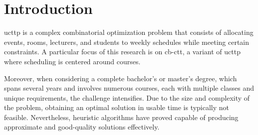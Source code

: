 
\chapter{Introduction}


\label{Introduction}


\ac{ucttp} is a complex combinatorial optimization problem that consists of allocating events, rooms, lecturers, and students to weekly schedules while meeting certain constraints. A particular focus of this research is on \ac{cb-ctt}, a variant of \ac{ucttp} where scheduling is centered around courses. 


Moreover, when considering a complete bachelor’s or master’s degree, which spans several years and involves numerous courses, each with multiple classes and unique requirements, the challenge intensifies. Due to the size and complexity of the problem, obtaining an optimal solution in usable time is typically not feasible. Nevertheless, heuristic algorithms have proved capable of producing approximate and good-quality solutions effectively. 

